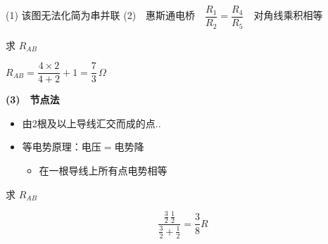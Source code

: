 \noindent (1)
\noindent 该图无法化简为串并联
\noindent (2)　惠斯通电桥　$\dfrac{R_1}{R_2}=\dfrac{R_4}{R_5}$　对角线乘积相等
\begin{problem}
求 $R_{AB}$
\begin{solution}
$R_{AB}=\dfrac{4\times2}{4+2}+1=\dfrac{7}{3}\,\Omega$
\end{solution}
\end{problem}
\noindent \textbf{(3)　节点法}
\begin{itemize}
\item 由2根及以上导线汇交而成的点..
\item 等电势原理：电压$=$电势降
\begin{itemize}
\item 在一根导线上所有点电势相等
\end{itemize}
\end{itemize}
\begin{problem}
求 $R_{AB}$
\begin{solution}
\[ \dfrac{\frac{3}{2}\,\frac{1}{2}}{\frac{3}{2}+\frac{1}{2}}=\dfrac{3}{8}R \]%
\end{solution}
\end{problem}
